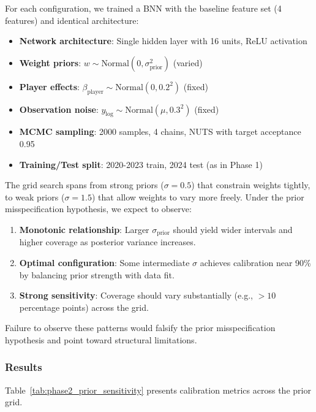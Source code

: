 For each configuration, we trained a BNN with the baseline feature set (4 features) and identical architecture:

\begin{itemize}
    \item \textbf{Network architecture}: Single hidden layer with 16 units, ReLU activation
    \item \textbf{Weight priors}: $w \sim \text{Normal}(0, \sigma_{\text{prior}}^2)$ (varied)
    \item \textbf{Player effects}: $\beta_{\text{player}} \sim \text{Normal}(0, 0.2^2)$ (fixed)
    \item \textbf{Observation noise}: $y_{\log} \sim \text{Normal}(\mu, 0.3^2)$ (fixed)
    \item \textbf{MCMC sampling}: 2000 samples, 4 chains, NUTS with target acceptance 0.95
    \item \textbf{Training/Test split}: 2020-2023 train, 2024 test (as in Phase 1)
\end{itemize}

The grid search spans from strong priors ($\sigma = 0.5$) that constrain weights tightly, to weak priors ($\sigma = 1.5$) that allow weights to vary more freely. Under the prior misspecification hypothesis, we expect to observe:

\begin{enumerate}
    \item \textbf{Monotonic relationship}: Larger $\sigma_{\text{prior}}$ should yield wider intervals and higher coverage as posterior variance increases.
    \item \textbf{Optimal configuration}: Some intermediate $\sigma$ achieves calibration near 90\% by balancing prior strength with data fit.
    \item \textbf{Strong sensitivity}: Coverage should vary substantially (e.g., $>10$ percentage points) across the grid.
\end{enumerate}

Failure to observe these patterns would falsify the prior misspecification hypothesis and point toward structural limitations.

\subsubsection{Results}

Table~\ref{tab:phase2_prior_sensitivity} presents calibration metrics across the prior grid.

\begin{table}[t]
\centering
\caption{Bayesian Neural Network Prior Sensitivity Analysis}
\label{tab:phase2_prior_sensitivity}

\end{table}

